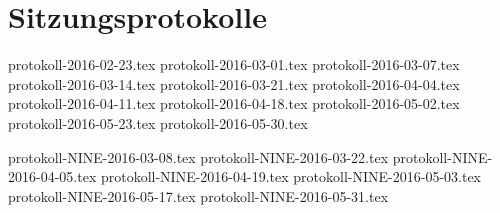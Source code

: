 \chapter{Sitzungsprotokolle}
\glsresetall


{protokoll-2016-02-23.tex}
{protokoll-2016-03-01.tex}
{protokoll-2016-03-07.tex}
{protokoll-2016-03-14.tex}
{protokoll-2016-03-21.tex}
{protokoll-2016-04-04.tex}
{protokoll-2016-04-11.tex}
{protokoll-2016-04-18.tex}
{protokoll-2016-05-02.tex}
{protokoll-2016-05-23.tex}
{protokoll-2016-05-30.tex}

{protokoll-NINE-2016-03-08.tex}
{protokoll-NINE-2016-03-22.tex}
{protokoll-NINE-2016-04-05.tex}
{protokoll-NINE-2016-04-19.tex}
{protokoll-NINE-2016-05-03.tex}
{protokoll-NINE-2016-05-17.tex}
{protokoll-NINE-2016-05-31.tex}